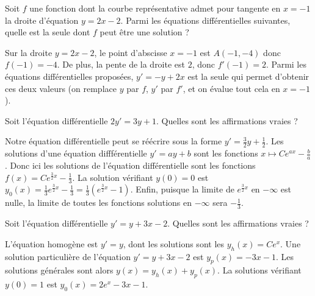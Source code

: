\begin{question}
Soit $f$ une fonction dont la courbe représentative admet pour tangente en $x=-1$ la droite d'équation $y=2x-2$. Parmi les équations différentielles suivantes, quelle est la seule dont $f$ peut être une solution ?
\begin{answers}
\end{answers}
\begin{explanations}
Sur la droite $y=2x-2$, le point d'abscisse $x=-1$ est $A(-1,-4)$ donc $f(-1)=-4$. De plus, la pente de la droite est $2$, donc $f'(-1)=2$. Parmi les équations différentielles proposées, $y'=-y+2x$ est la seule qui permet d'obtenir ces deux valeurs (on remplace $y$ par $f$, $y'$ par $f'$, et on évalue tout cela en $x=-1$).
\end{explanations}
\end{question}


\begin{question}
Soit l'équation différentielle $2y' = 3y + 1$.
Quelles sont les affirmations vraies ?
\begin{answers} 
\end{answers}
\begin{explanations}
Notre équation différentielle peut se réécrire sous la forme $y' = \frac 32 y + \frac 12$. Les solutions d'une équation diffférentielle $y' = ay + b$ sont les fonctions $x \mapsto C e^{ax} - \frac ba$. Donc ici les solutions de l'équation différentielle sont les fonctions $f(x) = Ce^{\frac32x} -\frac13$.
La solution vérifiant $y(0)=0$ est $y_0(x) = \frac13e^{\frac32x} -\frac13 = \frac 13 (e^{\frac 32 x} - 1)$. Enfin, puisque la limite de $e^{\frac 32 x}$ en $-\infty$ est nulle, la limite de toutes les fonctions solutions en $-\infty$ sera $-\frac 13$.
\end{explanations}
\end{question}


\begin{question}
Soit l'équation différentielle $y' = y + 3x-2$.
Quelles sont les affirmations vraies ?
\begin{answers} 
\end{answers}
\begin{explanations}
L'équation homogène est $y' = y$, dont les solutions sont les $y_h(x) = Ce^{x}$.
Une solution particulière de l'équation $y' = y + 3x-2$ est $y_p(x) = -3x-1$.
Les solutions générales sont alors $y(x) = y_h(x) + y_p(x)$.
La solutions vérifiant $y(0)=1$ est $y_0(x) = 2e^{x} -3x-1$.
\end{explanations}
\end{question}


